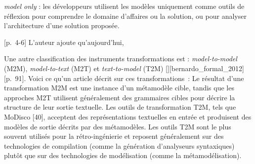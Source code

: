 {{\item [][---] \textit{model only} : \elide les développeurs utilisent les modèles uniquement comme outils de réflexion pour comprendre le domaine d'affaires ou la solution, ou pour analyser l'architecture d'une solution proposée.
}{[p.~4-6]}
L'auteur ajoute qu'aujourd'hui, 

Une autre classification des instruments transformations est : \textit{model-to-model} (M2M), \textit{model-to-text} (M2T) et \textit{text-to-model} (T2M) [][bernardo_formal_2012][p.~91]. Voici ce qu'un article décrit sur ces transformations~:
 {Le résultat d'une transformation M2M est une instance d'un métamodèle cible, tandis que les approches M2T utilisent généralement des grammaires cibles pour décrire la structure de leur sortie textuelle. Les outils de transformation T2M, tels que MoDisco [40], acceptent des représentations textuelles en entrée et produisent des modèles de sortie décrits par des métamodèles. Les outils T2M sont le plus souvent utilisés pour la rétro-ingénierie et reposent généralement sur des technologies de compilation (comme la génération d'analyseurs syntaxiques) plutôt que sur des technologies de modélisation (comme la métamodélisation).} {\cite{kahani_survey_2019}}

}{}

